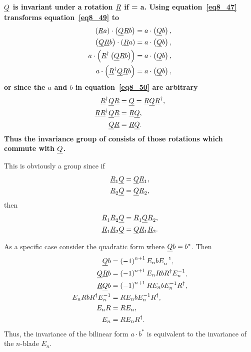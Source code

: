 {\bf $\underline{Q}$ is invariant under a rotation $\underline{R}$ if
\be\label{eq8_49}
	\cdot{} = a\cdot{}.
\ee
Using equation~\ref{eq8_47} transforms equation~\ref{eq8_49} to
\begin{align}
	\left ( {\underline{R}a} \right )\cdot\left ( {\underline{Q}\underline{R}b} \right ) &= a\cdot\left ( {\underline{Q}b} \right ), \nonumber \\
	\left ( {\underline{Q}\underline{R}b} \right )\cdot\left ( {\underline{R}a} \right ) &= a\cdot\left ( {\underline{Q}b} \right ), \nonumber \\
	a\cdot \left ( {\underline{R}^{\dagger}\left ( {\underline{Q}\underline{R}b} \right )} \right ) &= a\cdot\left ( {\underline{Q}b} \right ), \nonumber \\
	a\cdot\left ( {\underline{R}^{\dagger}\underline{Q}\underline{R}b} \right ) &= a\cdot\left ( {\underline{Q}b} \right ),\label{eq8_50}
\end{align}
or since the $a$ and $b$ in equation~\ref{eq8_50} are arbitrary
\begin{align}
	\underline{R}^{\dagger}\underline{Q}\underline{R} &= \underline{Q} = \underline{R}\underline{Q}\underline{R}^{\dagger}, \\
	\underline{R}\underline{R}^{\dagger}\underline{Q}\underline{R} &= \underline{R}\underline{Q}, \\
	\underline{Q}\underline{R} &= \underline{R}\underline{Q}.
\end{align}
Thus the invariance group of consists of those rotations which commute with $\underline{Q}$.}

This is obviously a group since if
\begin{align}
	\underline{R}_{1}\underline{Q} &= \underline{Q}\underline{R}_{1}, \\
	\underline{R}_{2}\underline{Q} &= \underline{Q}\underline{R}_{2},
\end{align}
then
\begin{align}
	\underline{R}_{1}\underline{R}_{2}\underline{Q} &= \underline{R}_{1}\underline{Q}\underline{R}_{2}, \\
	\underline{R}_{1}\underline{R}_{2}\underline{Q} &= \underline{Q}\underline{R}_{1}\underline{R}_{2}.
\end{align}

As a specific case consider the quadratic form where $\underline{Q}b = b^{*}$.  Then 
\begin{align}
	\underline{Q}b &= \left ( {-1} \right )^{n+1}E_{n}bE_{n}^{-1}, \\
	\underline{Q}\underline{R}b &= \left ( {-1} \right )^{n+1}E_{n}RbR^{\dagger}E_{n}^{-1}, \nonumber \\
	\underline{R}\underline{Q}b &= \left ( {-1} \right )^{n+1}RE_{n}bE_{n}^{-1}R^{\dagger}, \nonumber \\
	E_{n}RbR^{\dagger}E_{n}^{-1} &= RE_{n}bE_{n}^{-1}R^{\dagger}, \nonumber \\
	E_{n}R &= RE_{n}, \nonumber \\
	E_{n} &= RE_{n}R^{\dagger}.
\end{align}
Thus, the invariance of the bilinear form $a\cdot b^{*}$ is equivalent to the invariance of the 
$n$-blade $E_{n}$.

